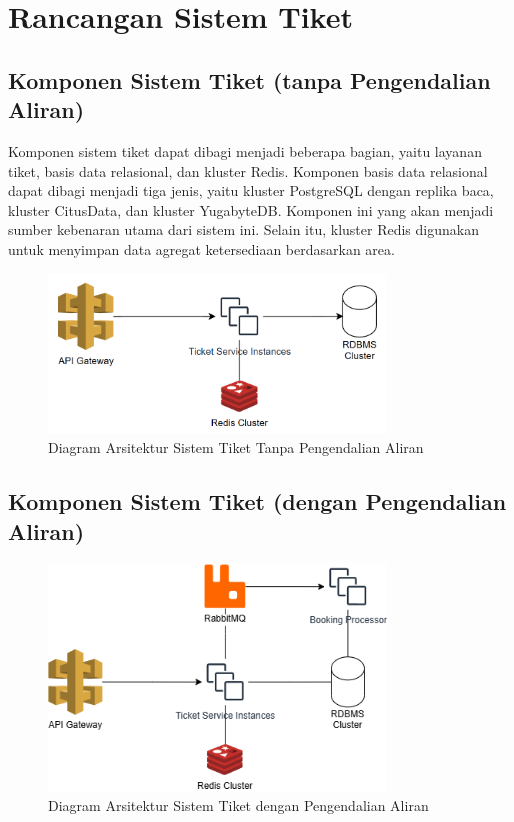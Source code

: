 \section{Rancangan Sistem Tiket}

\subsection{Komponen Sistem Tiket (tanpa Pengendalian Aliran)}

Komponen sistem tiket dapat dibagi menjadi beberapa bagian, yaitu layanan tiket, basis data relasional, dan kluster Redis. Komponen basis data relasional dapat dibagi menjadi tiga jenis, yaitu kluster PostgreSQL dengan replika baca, kluster CitusData, dan kluster YugabyteDB. Komponen ini yang akan menjadi sumber kebenaran utama dari sistem ini. Selain itu, kluster Redis digunakan untuk menyimpan data agregat ketersediaan berdasarkan area.

\begin{figure}[htbp]
    \centering
    \includegraphics[width=0.8\textwidth]{resources/chapter-3/ticket-nofc.png}
    \caption{Diagram Arsitektur Sistem Tiket Tanpa Pengendalian Aliran}
    \label{fig:ticket-nofc}
\end{figure}

\pagebreak

\subsection{Komponen Sistem Tiket (dengan Pengendalian Aliran)}

\begin{figure}[htbp]
    \centering
    \includegraphics[width=0.8\textwidth]{resources/chapter-3/ticket-fc.png}
    \caption{Diagram Arsitektur Sistem Tiket dengan Pengendalian Aliran}
    \label{fig:ticket-fc}
\end{figure}

